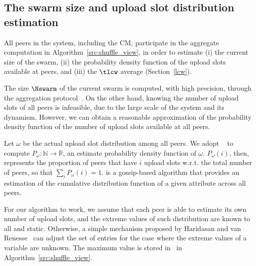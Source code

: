 \subsection{The swarm size and upload slot distribution estimation}

All peers in the system, including the CM, participate in the aggregate computation
in Algorithm~\ref{src:shuffle_view}, in order to
estimate (i) the current size of
the swarm, (ii) the probability density function of the upload slots available
at peers, and (iii) the $\tlcw$ average (Section~\ref{lcw}).

The size $\Nswarm$ of the current swarm is computed, with high precision,
through the aggregation protocol~\cite{aggregation}. On the other hand, knowing the
number of upload slots of all peers is infeasible, due to the large scale of
the system and its dynamism. However, we can obtain a reasonable approximation
of the probability density function of the number of upload slots available at
all peers.

Let $\omega$ be the actual upload slot distribution among all peers. We
adopt \adam~\cite{adam2} to compute $P_{\omega}: \mathbb{N} \rightarrow
\mathbb{R}$, an estimate probability density function of $\omega$.
$P_{\omega}(i)$, then, represents the proportion of peers that have $i$ upload
slots w.r.t. the total number of peers, so that $\sum_i P_{\omega}(i) = 1$.
\adam is a gossip-based algorithm that provides an estimation of the
cumulative distribution function of a given attribute across all peers.

For our algorithm to work, we assume that each peer is able to estimate its
own number of upload slots, and the extreme values of such distribution are
known to all and static. Otherwise, a simple mechanism proposed by Haridasan
and van Renesse~\cite{gossipestimation} can adjust the set of entries for the
case where the extreme values of a variable are unknown. The maximum value is
stored in \maxslot\ in Algorithm~\ref{src:shuffle_view}.

